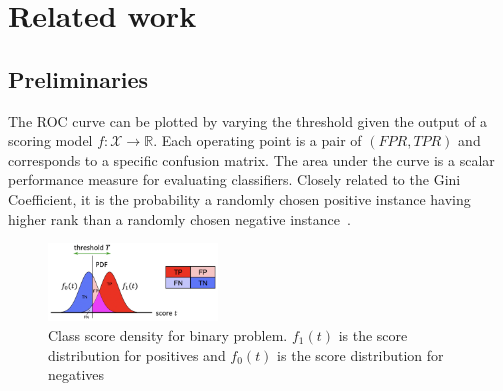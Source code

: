 \documentclass[twoside,11pt]{article}
\renewcommand{\>}{{\rightarrow}}
\newcommand{\1}{{\mathbf 1}}
\newcommand{\0}{{\mathbf 0}}
\begin{document}
\section{Related work}
\subsection{Preliminaries}

The ROC curve can be plotted by varying the threshold given the output of a scoring model $f : \mathcal{X} \rightarrow \mathbb{R}$. Each operating point is a pair of $(FPR, TPR)$ and corresponds to a specific confusion matrix. 
The area under the curve is a  scalar performance measure for evaluating classifiers. Closely related to the Gini Coefficient, it is the probability a randomly chosen positive instance having higher rank than a randomly chosen negative instance~\cite{Fawcett2006}.

\begin{figure}[h]
    \centering
    \includegraphics[width=0.4\textwidth]{./pic/binary_ROC.png}
    \caption{Class score density for binary problem. $f_1(t)$ is the score distribution for positives and $f_0(t)$ is the score distribution for negatives}
    \label{fig:binary_roc}
\end{figure}
\end{document}
